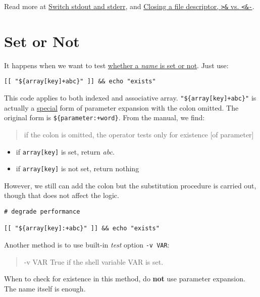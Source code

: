 Read more at \href{https://unix.stackexchange.com/q/42728}{Switch
  stdout and stderr},
 and
\href{https://unix.stackexchange.com/q/131801}{Closing a file
  descriptor, \texttt{>\&} vs. \texttt{<\&-}}.

\section{Set or Not}
\label{sec:set-or-not}

It happens when we want to test
\href{https://stackoverflow.com/a/13221491}{whether a \textit{name}
  is set or not}. Just use:

\begin{lstlisting}
[[ "${array[key]+abc}" ]] && echo "exists"
\end{lstlisting}

This code applies to both indexed and associative
array. \lstinline|"${array[key]+abc}"| is actually a
\uline{special} form of parameter expansion with the colon
omitted. The original form is
\lstinline|${parameter:+word}|. From the manual, we find:

\begin{quotation}
  if the colon is omitted, the operator tests only for existence [of parameter] 
\end{quotation}

\begin{itemize}
\item if \lstinline|array[key]| is set, return \textit{abc}.
\item if \lstinline|array[key]| is not set, return nothing
\end{itemize}

However, we still can add the colon but the substitution procedure
is carried out, though that does not affect the logic.

\begin{lstlisting}
# degrade performance

[[ "${array[key]:+abc}" ]] && echo "exists"
\end{lstlisting}

Another method is to use built-in \textit{test} option
\verb|-v VAR|:

\begin{quotation}
  -v VAR         True if the shell variable VAR is set.
\end{quotation}

When to check for existence in this method, do \textbf{not} use
parameter expansion. The name itself is enough.

